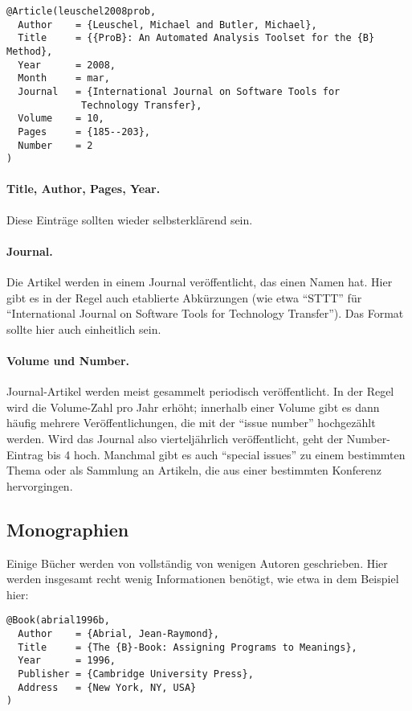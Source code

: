 \begin{verbatim}
@Article(leuschel2008prob,
  Author	= {Leuschel, Michael and Butler, Michael},
  Title		= {{ProB}: An Automated Analysis Toolset for the {B} Method},
  Year		= 2008,
  Month		= mar,
  Journal	= {International Journal on Software Tools for
             Technology Transfer},
  Volume	= 10,
  Pages		= {185--203},
  Number	= 2
)
\end{verbatim}

\paragraph{Title, Author, Pages, Year.} Diese Einträge sollten wieder selbsterklärend sein.
\paragraph{Journal.} Die Artikel werden in einem Journal veröffentlicht, das einen Namen hat.
Hier gibt es in der Regel auch etablierte Abkürzungen (wie etwa \enquote{STTT} für
\enquote{International Journal on Software Tools for Technology Transfer}).
Das Format sollte hier auch einheitlich sein.
\paragraph{Volume und Number.} Journal-Artikel werden meist gesammelt periodisch veröffentlicht.
In der Regel wird die Volume-Zahl pro Jahr erhöht;
innerhalb einer Volume gibt es dann häufig mehrere Veröffentlichungen, die mit der \enquote{issue number} hochgezählt werden.
Wird das Journal also vierteljährlich veröffentlicht, geht der Number-Eintrag bis 4 hoch.
Manchmal gibt es auch \enquote{special issues} zu einem bestimmten Thema oder als Sammlung an Artikeln,
die aus einer bestimmten Konferenz hervorgingen.

\subsection{Monographien}

Einige Bücher werden von vollständig von wenigen Autoren geschrieben.
Hier werden insgesamt recht wenig Informationen benötigt,
wie etwa in dem Beispiel hier:

\begin{verbatim}
@Book(abrial1996b,
  Author	= {Abrial, Jean-Raymond},
  Title		= {The {B}-Book: Assigning Programs to Meanings},
  Year		= 1996,
  Publisher	= {Cambridge University Press},
  Address	= {New York, NY, USA}
)
\end{verbatim}

